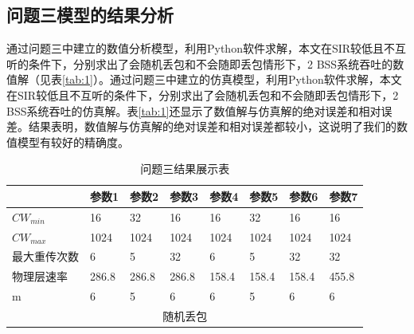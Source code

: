 \documentclass[bwprint]{gmcmthesis}
\begin{document}
\subsection{问题三模型的结果分析}

通过问题三中建立的数值分析模型，利用Python软件求解，本文在SIR较低且不互听的条件下，分别求出了会随机丢包和不会随即丢包情形下，2 BSS系统吞吐的数值解（见表\ref{tab:1}）。通过问题三中建立的仿真模型，利用Python软件求解，本文在SIR较低且不互听的条件下，分别求出了会随机丢包和不会随即丢包情形下，2 BSS系统吞吐的仿真解。表\ref{tab:1}还显示了数值解与仿真解的绝对误差和相对误差。结果表明，数值解与仿真解的绝对误差和相对误差都较小，这说明了我们的数值模型有较好的精确度。

\begin{table}[H]
\centering
\caption{问题三结果展示表}
\begin{tabular}{|llllllll|}
\hline
\multicolumn{1}{|l|}{}       & \multicolumn{1}{l|}{参数1}   & \multicolumn{1}{l|}{参数2}    & \multicolumn{1}{l|}{参数3}    & \multicolumn{1}{l|}{参数4}    & \multicolumn{1}{l|}{参数5}   & \multicolumn{1}{l|}{参数6}    & 参数7    \\ \hline
\multicolumn{1}{|l|}{$CW_{min}$} & \multicolumn{1}{l|}{16}    & \multicolumn{1}{l|}{32}     & \multicolumn{1}{l|}{16}     & \multicolumn{1}{l|}{16}     & \multicolumn{1}{l|}{32}    & \multicolumn{1}{l|}{16}     & 16     \\ \hline
\multicolumn{1}{|l|}{$CW_{max}$} & \multicolumn{1}{l|}{1024}  & \multicolumn{1}{l|}{1024}   & \multicolumn{1}{l|}{1024}   & \multicolumn{1}{l|}{1024}   & \multicolumn{1}{l|}{1024}  & \multicolumn{1}{l|}{1024}   & 1024   \\ \hline
\multicolumn{1}{|l|}{最大重传次数} & \multicolumn{1}{l|}{6}     & \multicolumn{1}{l|}{5}      & \multicolumn{1}{l|}{32}     & \multicolumn{1}{l|}{6}      & \multicolumn{1}{l|}{5}     & \multicolumn{1}{l|}{32}     & 32     \\ \hline
\multicolumn{1}{|l|}{物理层速率}  & \multicolumn{1}{l|}{286.8} & \multicolumn{1}{l|}{286.8}  & \multicolumn{1}{l|}{286.8}  & \multicolumn{1}{l|}{158.4}  & \multicolumn{1}{l|}{158.4} & \multicolumn{1}{l|}{158.4}  & 455.8  \\ \hline
\multicolumn{1}{|l|}{m}      & \multicolumn{1}{l|}{6}     & \multicolumn{1}{l|}{5}      & \multicolumn{1}{l|}{6}      & \multicolumn{1}{l|}{6}      & \multicolumn{1}{l|}{5}     & \multicolumn{1}{l|}{6}      & 6      \\ \hline
\multicolumn{8}{|c|}{随机丢包}                                                                                                                                                                                              \\ \hline

\end{tabular}
\end{table}
\end{document}

